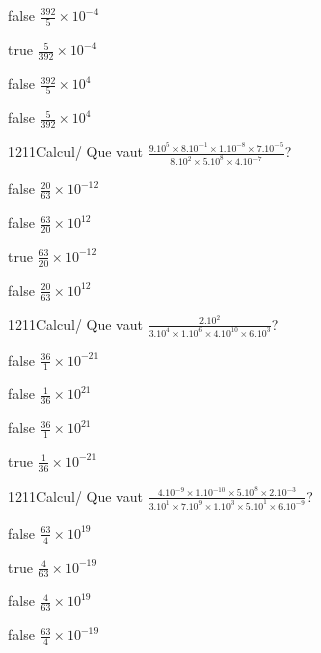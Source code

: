             \begin{reponses}
                \item[false] $\frac{392}{5}\times 10^{-4}$
                \item[true] $\frac{5}{392}\times 10^{-4}$
                \item[false] $\frac{392}{5}\times 10^{4}$
                \item[false] $\frac{5}{392}\times 10^{4}$
            \end{reponses}
            \begin{question}{1211}{Calcul}{}{/}
                Que vaut $\frac{9.10^{5}\times 8.10^{-1}\times 1.10^{-8}\times 7.10^{-5}}{8.10^{2}\times 5.10^{8}\times 4.10^{-7}}$?
            \end{question}
            \begin{reponses}
                \item[false] $\frac{20}{63}\times 10^{-12}$
                \item[false] $\frac{63}{20}\times 10^{12}$
                \item[true] $\frac{63}{20}\times 10^{-12}$
                \item[false] $\frac{20}{63}\times 10^{12}$
            \end{reponses}
            \begin{question}{1211}{Calcul}{}{/}
                Que vaut $\frac{2.10^{2}}{3.10^{4}\times 1.10^{6}\times 4.10^{10}\times 6.10^{3}}$?
            \end{question}
            \begin{reponses}
                \item[false] $\frac{36}{1}\times 10^{-21}$
                \item[false] $\frac{1}{36}\times 10^{21}$
                \item[false] $\frac{36}{1}\times 10^{21}$
                \item[true] $\frac{1}{36}\times 10^{-21}$
            \end{reponses}
            \begin{question}{1211}{Calcul}{}{/}
                Que vaut $\frac{4.10^{-9}\times 1.10^{-10}\times 5.10^{8}\times 2.10^{-3}}{3.10^{1}\times 7.10^{9}\times 1.10^{3}\times 5.10^{1}\times 6.10^{-9}}$?
            \end{question}
            \begin{reponses}
                \item[false] $\frac{63}{4}\times 10^{19}$
                \item[true] $\frac{4}{63}\times 10^{-19}$
                \item[false] $\frac{4}{63}\times 10^{19}$
                \item[false] $\frac{63}{4}\times 10^{-19}$
            \end{reponses}
